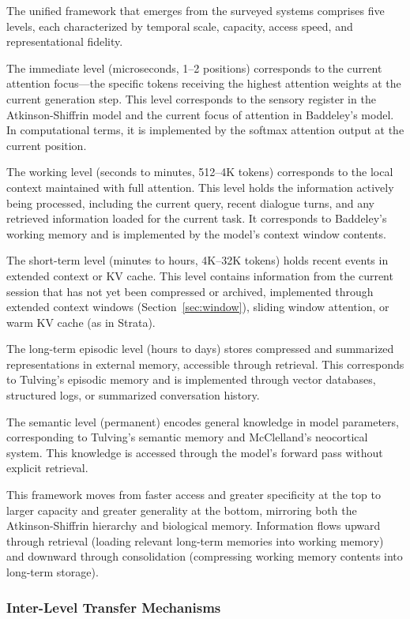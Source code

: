 \documentclass[11pt,letterpaper]{article}
\begin{document}
The unified framework that emerges from the surveyed systems comprises five levels, each characterized by temporal scale, capacity, access speed, and representational fidelity.

The immediate level (microseconds, 1--2 positions) corresponds to the current attention focus---the specific tokens receiving the highest attention weights at the current generation step. This level corresponds to the sensory register in the Atkinson-Shiffrin model and the current focus of attention in Baddeley's model. In computational terms, it is implemented by the softmax attention output at the current position.

The working level (seconds to minutes, 512--4K tokens) corresponds to the local context maintained with full attention. This level holds the information actively being processed, including the current query, recent dialogue turns, and any retrieved information loaded for the current task. It corresponds to Baddeley's working memory and is implemented by the model's context window contents.

The short-term level (minutes to hours, 4K--32K tokens) holds recent events in extended context or KV cache. This level contains information from the current session that has not yet been compressed or archived, implemented through extended context windows (Section~\ref{sec:window}), sliding window attention, or warm KV cache (as in Strata).

The long-term episodic level (hours to days) stores compressed and summarized representations in external memory, accessible through retrieval. This corresponds to Tulving's episodic memory and is implemented through vector databases, structured logs, or summarized conversation history.

The semantic level (permanent) encodes general knowledge in model parameters, corresponding to Tulving's semantic memory and McClelland's neocortical system. This knowledge is accessed through the model's forward pass without explicit retrieval.

This framework moves from faster access and greater specificity at the top to larger capacity and greater generality at the bottom, mirroring both the Atkinson-Shiffrin hierarchy and biological memory. Information flows upward through retrieval (loading relevant long-term memories into working memory) and downward through consolidation (compressing working memory contents into long-term storage).

\subsubsection{Inter-Level Transfer Mechanisms}
\end{document}
